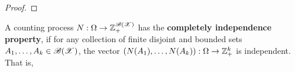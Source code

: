 \documentclass[letterpaper,10pt,english]{article}
\begin{document}
\begin{proof}
\end{proof}
\begin{defn} 
A counting process $N:\Omega\to\mathbb{Z}_+^{\mathscr{B}(\mathscr{X})}$ has the \textbf{completely independence property},  
if for any collection of finite disjoint and bounded sets $A_1, \dots, A_k \in \mathscr{B}(\mathscr{X})$, 
the vector $(N(A_1), \dots, N(A_k)):\Omega \to \mathbb{Z}_+^k$ is independent. 
That is,
\end{defn}
\end{document}
